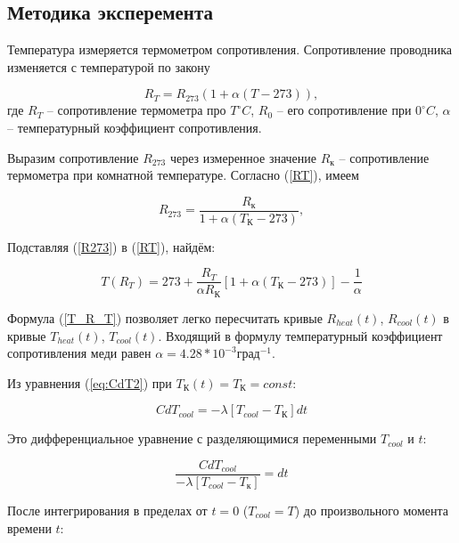 \subsection{Методика эксперемента}
Температура измеряется термометром сопротивления. Сопротивление проводника изменяется с температурой по закону

\begin{equation}
    R_{T} = R_{273}(1 + \alpha (T - 273)),
    \label{RT}
\end{equation}
где $R_{T}$ -- сопротивление термометра про $T  ^{\circ}C$, $R_{0}$ -- его сопротивление при $0  ^{\circ}C$, $\alpha$ -- температурный коэффициент сопротивления.

Выразим сопротивление $R_{273}$ через измеренное значение $R_{к}$ -- сопротивление термометра при комнатной температуре. Согласно (\ref{RT}), имеем

\begin{equation}
    R_{273} = \frac{R_{к}}{1 + \alpha (T_\text{К} - 273)},
    \label{R273}
\end{equation}

Подставляя (\ref{R273}) в (\ref{RT}), найдём:

\begin{equation}
    T(R_T) = 273 + \frac{R_T}{\alpha R_\text{К}} \left[ 1 + \alpha (T_\text{К} - 273) \right] - \frac{1}{\alpha}
    \label{T_R_T}
\end{equation}

Формула (\ref{T_R_T}) позволяет легко пересчитать кривые $R_{heat}(t)$, $R_{cool}(t)$ в кривые $T_{heat}(t)$, $T_{cool}(t)$. Входящий в формулу температурный коэффициент сопротивления меди равен $\alpha = 4.28*10^{-3} град^{-1}$.

Из уравнения (\ref{eq:CdT2}) при $T_\text{К}(t) = T_\text{К} = const$:

\begin{equation}
    C dT_{cool} = - \lambda \left[ T_{cool} - T_\text{К} \right] dt
    \label{C_dT_cool}
\end{equation}

Это дифференциальное уравнение с разделяющимися переменными $T_{cool}$ и $t$:

\begin{equation}
    \frac{C dT_{cool}}{- \lambda \left[ T_{cool} - T_{к} \right]} = dt
    \label{eq:diff}
\end{equation}

После интегрирования в пределах от $t=0$ ($T_{cool} = T$) до произвольного момента времени $t$:

